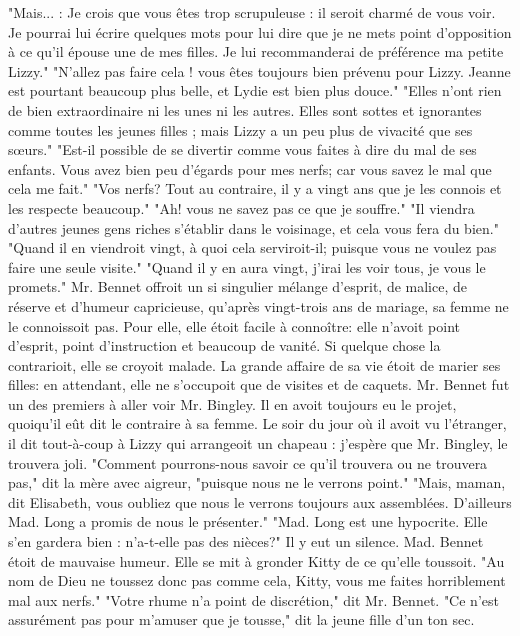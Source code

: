 "Mais... : Je crois que vous êtes trop scrupuleuse : il seroit charmé de vous voir. Je pourrai lui écrire quelques mots pour lui dire que je ne mets point d’opposition à ce qu’il épouse une de mes filles. Je lui recommanderai de préférence ma petite Lizzy."
"N’allez pas faire cela ! vous êtes toujours bien prévenu pour Lizzy. Jeanne est pourtant beaucoup plus belle, et Lydie est bien plus douce."
"Elles n’ont rien de bien extraordinaire ni les unes ni les autres. Elles sont sottes et ignorantes comme toutes les jeunes filles ; mais Lizzy a un peu plus de vivacité que ses sœurs."
\setcounter{page}{376}
"Est-il possible de se divertir comme vous faites à dire du mal de ses enfants. Vous avez bien peu d’égards pour mes nerfs; car vous savez le mal que cela me fait."
"Vos nerfs? Tout au contraire, il y a vingt ans que je les connois et les respecte beaucoup."
"Ah! vous ne savez pas ce que je souffre."
"Il viendra d’autres jeunes gens riches s’établir dans le voisinage, et cela vous fera du bien."
"Quand il en viendroit vingt, à quoi cela serviroit-il; puisque vous ne voulez pas faire une seule visite."
"Quand il y en aura vingt, j’irai les voir tous, je vous le promets."
Mr. Bennet offroit un si singulier mélange d’esprit, de malice, de réserve et d’humeur capricieuse, qu’après vingt-trois ans de mariage, sa femme ne le connoissoit pas. Pour elle, elle étoit facile à connoître: elle n’avoit point d’esprit, point d’instruction et beaucoup de vanité. Si quelque chose la contrarioit, elle se croyoit malade. La grande affaire de sa vie étoit de marier ses filles: en attendant, elle ne s’occupoit que de visites et de caquets.
Mr. Bennet fut un des premiers à aller\setcounter{page}{377} voir Mr. Bingley. Il en avoit toujours eu le projet, quoiqu'il eût dit le contraire à sa femme. Le soir du jour où il avoit vu l'étranger, il dit tout-à-coup à Lizzy qui arrangeoit un chapeau : j'espère que Mr. Bingley, le trouvera joli.
"Comment pourrons-nous savoir ce qu'il trouvera ou ne trouvera pas," dit la mère avec aigreur, "puisque nous ne le verrons point."
"Mais, maman, dit Elisabeth, vous oubliez que nous le verrons toujours aux assemblées. D'ailleurs Mad. Long a promis de nous le présenter."
"Mad. Long est une hypocrite. Elle s'en gardera bien : n'a-t-elle pas des nièces?"
Il y eut un silence. Mad. Bennet étoit de mauvaise humeur. Elle se mit à gronder Kitty de ce qu'elle toussoit. "Au nom de Dieu ne toussez donc pas comme cela, Kitty, vous me faites horriblement mal aux nerfs."
"Votre rhume n'a point de discrétion," dit Mr. Bennet.
"Ce n'est assurément pas pour m'amuser que je tousse," dit la jeune fille d'un ton sec.

